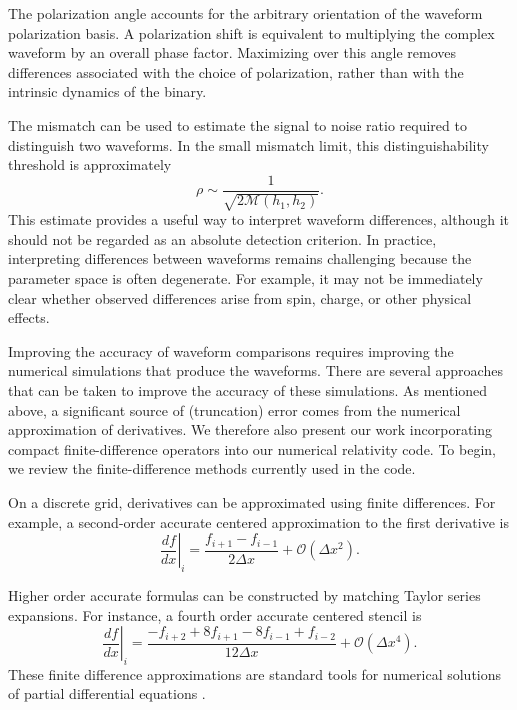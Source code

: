 The polarization angle accounts for the arbitrary orientation of the waveform polarization basis. A polarization shift is equivalent to multiplying the complex waveform by an overall phase factor. Maximizing over this angle removes differences associated with the choice of polarization, rather than with the intrinsic dynamics of the binary.

The mismatch can be used to estimate the signal to noise ratio required to distinguish two waveforms. In the small mismatch limit, this distinguishability threshold is approximately
\begin{equation}
\rho \sim \frac{1}{\sqrt{2 \mathcal{M}(h_1,h_2)}}.
\end{equation}
This estimate provides a useful way to interpret waveform differences, although it should not be regarded as an absolute detection criterion. In practice, interpreting differences between waveforms remains challenging because the parameter space is often degenerate. For example, it may not be immediately clear whether observed differences arise from spin, charge, or other physical effects.

Improving the accuracy of waveform comparisons requires improving the numerical simulations that produce the waveforms. There are several approaches that can be taken to improve the accuracy of these simulations. As mentioned above, a significant source of (truncation) error comes from the numerical approximation of derivatives. We therefore also present our work incorporating compact finite-difference operators into our numerical relativity code. To begin, we review the finite-difference methods currently used in the code.

On a discrete grid, derivatives can be approximated using finite differences. For example, a second-order accurate centered approximation to the first derivative is
\begin{equation}
\left.\frac{df}{dx}\right| _{i}
=
\frac{f _{i+1} - f_{i-1}}{2\Delta x}
+ \mathcal{O}(\Delta x^2).
\end{equation}

Higher order accurate formulas can be constructed by matching Taylor series expansions. For instance, a fourth order accurate centered stencil is
\begin{equation}
\left.\frac{df}{dx}\right| _{i}
=
\frac{-f _{i+2} + 8 f_{i+1} - 8 f_{i-1} + f_{i-2}}{12\Delta x}
+ \mathcal{O}(\Delta x^4).
\end{equation}
These finite difference approximations are standard tools for numerical solutions of partial differential equations \cite{Baumgarte2010}.

